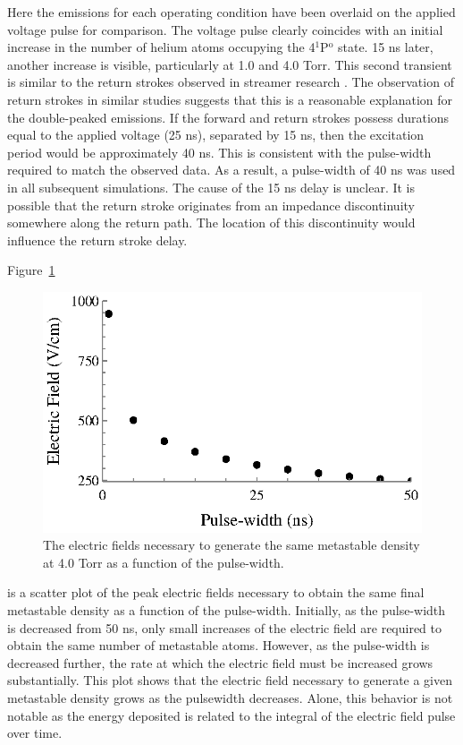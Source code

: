 Here the emissions for each operating condition have been overlaid on the
applied voltage pulse for comparison. The voltage pulse clearly coincides with
an initial increase in the number of helium atoms occupying the
4$^1$P$^\mathrm{o}$ state. 15 ns later, another increase is visible,
particularly at 1.0 and 4.0 Torr. This second transient is similar to the return
strokes observed in streamer research \cite{Snoddy1936, Loeb1940, Mitchell1947}.
The observation of return strokes in similar studies \cite{Vasilyak1994,
Pai2009, Starikovskiy2013} suggests that this is a reasonable explanation for
the double-peaked emissions. If the forward and return strokes possess durations
equal to the applied voltage (25 ns), separated by 15 ns, then the excitation
period would be approximately 40 ns. This is consistent with the pulse-width
required to match the observed data. As a result, a pulse-width of 40 ns was
used in all subsequent simulations. The cause of the 15 ns delay is unclear. It
is possible that the return stroke originates from an impedance discontinuity
somewhere along the return path. The location of this discontinuity would
influence the return stroke delay.

Figure~\ref{fig:fieldtau}
\begin{figure}
  \centering
  \includegraphics{./chapters/modeling/figures/fieldtau.eps}
  \caption{The electric fields necessary to generate the same metastable density
    at 4.0 Torr as a function of the pulse-width.}
  \label{fig:fieldtau}
\end{figure}
is a scatter plot of the peak electric fields necessary to obtain the same final
metastable density as a function of the pulse-width. Initially, as the
pulse-width is decreased from 50 ns, only small increases of the electric field
are required to obtain the same number of metastable atoms. However, as the
pulse-width is decreased further, the rate at which the electric field must be
increased grows substantially. This plot shows that the electric field necessary
to generate a given metastable density grows as the pulsewidth decreases. Alone,
this behavior is not notable as the energy deposited is related to the integral
of the electric field pulse over time.

